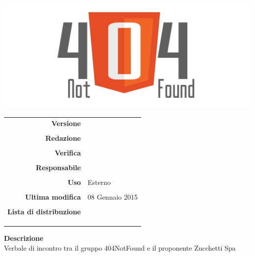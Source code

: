 \thispagestyle{empty}

\begin{titlepage}

	\begin{center}
	\begin{Huge}
		\textbf{\gruppo} \\
	\end{Huge}
	\vspace{0.5cm}
	\begin{Large}
		\textbf{\capitolato}
	\end{Large}
	
	\vspace{1cm}

	\includegraphics[scale=0.35]{../logo/logo404_Extends.png}
	\vspace{1cm}
	\begin{Huge}
		\textbf{\titDoc}
	\end{Huge}
	
	\vspace{1cm}
	
	\begin{table}[h]
	\begin{center}
	\begin{tabular}{r | l}
		\textbf{Versione} & \versione \\ \\
		\textbf{Redazione} & \CaMa\\ \\
		\textbf{Verifica} & \CoMa \\ \\
		\textbf{Responsabile} & \VeFe \\ \\
		\textbf{Uso} & Esterno \\ \\
		\textbf{Ultima modifica} & 08 Gennaio 2015 \\ \\
		\textbf{Lista di distribuzione} & \gruppo \\ 
			& \Vardanega \\
			& \Cardin \\
			& \Zucchetti \\
	\end{tabular}
	\end{center}
	\end{table}
		\textbf{Descrizione} \\
		Verbale di incontro tra il gruppo 404NotFound e il proponente Zucchetti Spa
	\end{center}
\end{titlepage}